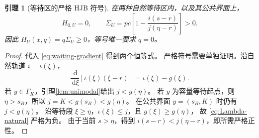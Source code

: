 \documentclass[11pt,a4paper,UTF8]{ctexart}
\newtheorem{lemma}[theorem]{引理}
\theoremstyle{definition}
\newcommand{\dd}{\,\mathrm d}
\begin{document}
\begin{lemma}[等待区的严格 HJB 符号]
\label{lem:waiting-HJB}
在两种自然等待区内，以及其公共界面上，
\begin{equation}
H_{0,U}=0,\qquad
\Sigma_U=pc\left[1-\frac{i(s-r)}{j(\eta-r)}\right]>0.
\label{eq:waiting-HJB}
\end{equation}
因此 $H_U(x,q)=q\Sigma_U\ge0$，等号唯一要求 $q=0$。
\end{lemma}
\begin{proof}
代入 \eqref{eq:waiting-gradient} 得到两个恒等式。
严格符号需要单独证明。沿自然轨道 $i=\iota(\xi)$，
\begin{equation}
\frac{\dd}{\dd\xi}[\iota(\xi)(\xi-r)]=\iota(\xi)-g(\xi).
\label{eq:Lambda-natural}
\end{equation}
若 $y\in\Gamma_K$，引理\ref{lem:unimodal}给出 $j<g(\eta)$。
若 $y$ 为容量等待起点，则 $\eta>s_B$，所以 $j=K<g(s_B)<g(\eta)$。
在公共界面 $y=(s_B,K)$ 时仍有 $j<g(\eta)$。
沿等待段 $\xi\ge\eta$，$\iota(\xi)\le j$，且 $g(\xi)\ge g(\eta)$，
故 \eqref{eq:Lambda-natural} 严格为负。
由于当前 $s>\eta$，得到 $i(s-r)<j(\eta-r)$，即所需严格正性。
\end{proof}
\end{document}
